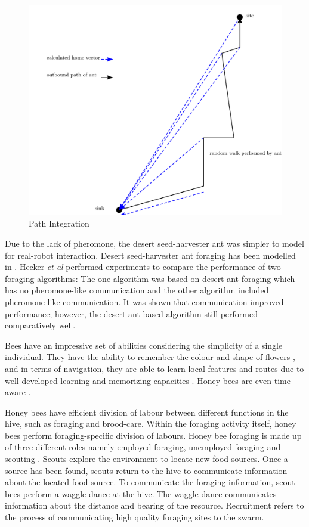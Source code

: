 \documentclass[preprint,12pt]{elsarticle}
\begin{document}
\begin{figure} [h]
	\centering
	\includegraphics[width=\textwidth]{figures/drawing.png}
	\caption{Path Integration}
	\label{pathintegration}
\end{figure}

Due to the lack of pheromone, the desert seed-harvester ant was simpler to model for real-robot interaction. Desert seed-harvester ant foraging has been modelled in \cite{moller1998modeling,hecker2012formica}. Hecker \textit{et al} \cite{hecker2012formica} performed experiments to compare the performance of two foraging algorithms: The one algorithm was based on desert ant foraging which has no pheromone-like communication and the other algorithm included pheromone-like communication. It was shown that communication improved performance; however, the desert ant based algorithm still performed comparatively well. 

Bees have an impressive set of abilities considering the simplicity of a single individual. They have the ability to remember the colour and shape of flowers \cite{zhang2006honeybee}, and in terms of navigation, they are able to learn local features and routes due to well-developed learning and memorizing capacities \cite{menzel2001cognitive}. Honey-bees are even time aware \cite{moore1989influence}. 

Honey bees have efficient division of labour between different functions in the hive, such as foraging and brood-care. Within the foraging activity itself, honey bees perform foraging-specific division of labours. Honey bee foraging is made up of three different roles namely employed foraging, unemployed foraging and scouting \cite{seeley2009wisdom}. Scouts explore the environment to locate new food sources. Once a source has been found, scouts return to the hive to communicate information about the located food source. To communicate the foraging information, scout bees perform a waggle-dance at the hive. The waggle-dance communicates information about the distance and bearing of the resource. Recruitment \cite{seeley2009wisdom} refers to the process of communicating high quality foraging sites to the swarm.
\end{document}
